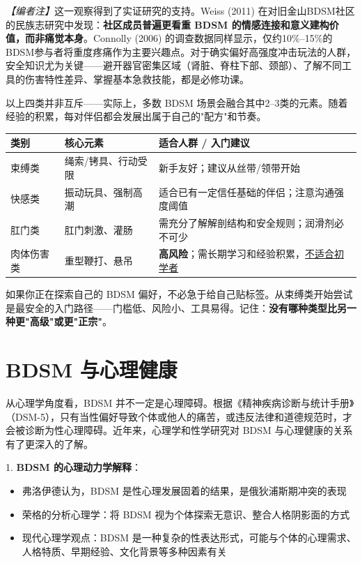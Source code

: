 \documentclass[12pt,UTF8]{ctexbook}
\begin{document}
\textit{【编者注】}这一观察得到了实证研究的支持。Weiss (2011) 在对旧金山BDSM社区的民族志研究中发现：\textbf{社区成员普遍更看重 BDSM 的情感连接和意义建构价值，而非痛觉本身}。Connolly (2006) 的调查数据同样显示，仅约10\%--15\%的BDSM参与者将重度疼痛作为主要兴趣点。对于确实偏好高强度冲击玩法的人群，安全知识尤为关键——避开器官密集区域（肾脏、脊柱下部、颈部）、了解不同工具的伤害特性差异、掌握基本急救技能，都是必修功课。

\noindent 以上四类并非互斥——实际上，多数 BDSM 场景会融合其中2--3类的元素。随着经验的积累，每对伴侣都会发展出属于自己的"配方"和节奏。

\begin{center}
\begin{tabular}{|p{2.8cm}|p{4cm}|p{5.8cm}|}
\hline
\textbf{类别} & \textbf{核心元素} & \textbf{适合人群 / 入门建议} \\
\hline
束缚类 & 绳索/铐具、行动受限 & 新手友好；建议从丝带/领带开始 \\
\hline
快感类 & 振动玩具、强制高潮 & 适合已有一定信任基础的伴侣；注意沟通强度阈值 \\
\hline
肛门类 & 肛门刺激、灌肠 & 需充分了解解剖结构和安全规则；润滑剂必不可少 \\
\hline
肉体伤害类 & 重型鞭打、悬吊 & \textbf{高风险}；需长期学习和经验积累，\underline{不适合初学者} \\
\hline
\end{tabular}
\end{center}

\begin{tcolorbox}[colback=pink!5!white,colframe=red!50!black,title=贴心小叮咛]
如果你正在探索自己的 BDSM 偏好，不必急于给自己贴标签。从束缚类开始尝试是最安全的入门路径——门槛低、风险小、工具易得。记住：\textbf{没有哪种类型比另一种更"高级"或更"正宗"}。
\end{tcolorbox}

\section{BDSM 与心理健康}

从心理学角度看，BDSM 并不一定是心理障碍。根据《精神疾病诊断与统计手册》（DSM-5），只有当性偏好导致个体或他人的痛苦，或违反法律和道德规范时，才会被诊断为性心理障碍。近年来，心理学和性学研究对 BDSM 与心理健康的关系有了更深入的了解。

1. \textbf{BDSM 的心理动力学解释}：
  \begin{itemize}
  \item 弗洛伊德认为，BDSM 是性心理发展固着的结果，是俄狄浦斯期冲突的表现
  \item 荣格的分析心理学：将 BDSM 视为个体探索无意识、整合人格阴影面的方式
  \item 现代心理学观点：BDSM 是一种复杂的性表达形式，可能与个体的心理需求、人格特质、早期经验、文化背景等多种因素有关
  \end{itemize}
\end{document}
